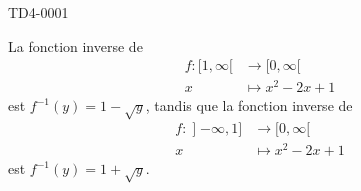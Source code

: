 \begin{corrige}{TD4-0001}
\begin{enumerate}
			La fonction inverse de 
			\begin{equation}
				\begin{aligned}
					f\colon \mathopen[ 1 , \infty [&\to \mathopen[ 0 , \infty [ \\
					x&\mapsto x^2-2x+1 
				\end{aligned}
			\end{equation}
			est $f^{-1}(y)=1-\sqrt{y}$, tandis que la fonction inverse de
			\begin{equation}
				\begin{aligned}
					f\colon \mathopen] -\infty , 1 ]&\to \mathopen[ 0 , \infty [ \\
					x&\mapsto x^2-2x+1 
				\end{aligned}
			\end{equation}
			est $f^{-1}(y)=1+\sqrt{y}$.
	\end{enumerate}

\end{corrige}
